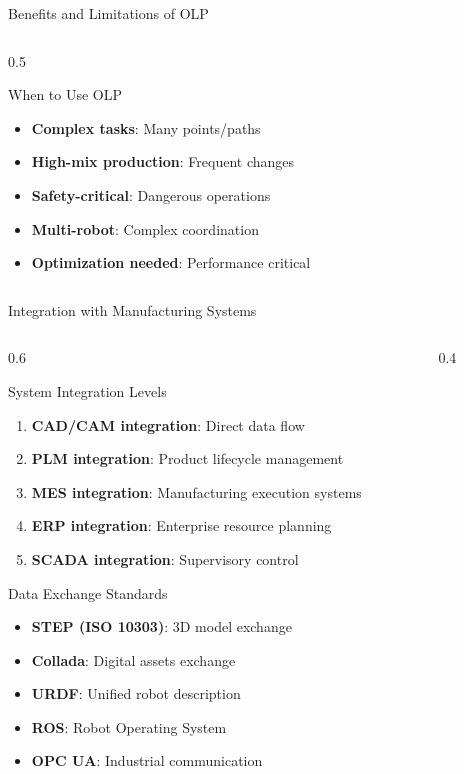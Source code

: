 \documentclass[10pt,aspectratio=169]{beamer}
\begin{document}
\begin{frame}{Benefits and Limitations of OLP}
\begin{columns}[T]
\begin{column}{0.5\textwidth}
\begin{alertblock}{When to Use OLP}
\begin{itemize}
\item \textbf{Complex tasks}: Many points/paths
\item \textbf{High-mix production}: Frequent changes
\item \textbf{Safety-critical}: Dangerous operations
\item \textbf{Multi-robot}: Complex coordination
\item \textbf{Optimization needed}: Performance critical
\end{itemize}
\end{alertblock}
\end{column}
\end{columns}
\end{frame}

\begin{frame}{Integration with Manufacturing Systems}
\begin{columns}[T]
\begin{column}{0.6\textwidth}
\begin{block}{System Integration Levels}
\begin{enumerate}
\item \textbf{CAD/CAM integration}: Direct data flow
\item \textbf{PLM integration}: Product lifecycle management
\item \textbf{MES integration}: Manufacturing execution systems
\item \textbf{ERP integration}: Enterprise resource planning
\item \textbf{SCADA integration}: Supervisory control
\end{enumerate}
\end{block}
\begin{alertblock}{Data Exchange Standards}
\begin{itemize}
\item \textbf{STEP (ISO 10303)}: 3D model exchange
\item \textbf{Collada}: Digital assets exchange
\item \textbf{URDF}: Unified robot description
\item \textbf{ROS}: Robot Operating System
\item \textbf{OPC UA}: Industrial communication
\end{itemize}
\end{alertblock}
\end{column}
\begin{column}{0.4\textwidth}

\end{column}
\end{columns}
\end{frame}
\end{document}
